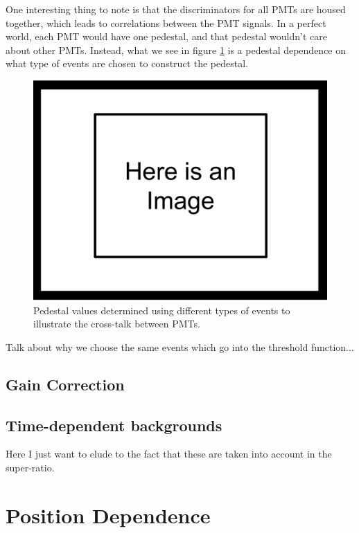 One interesting thing to note is that the discriminators for all PMTs are housed 
together, which leads to correlations between the PMT signals. In a perfect world, 
each PMT would have one pedestal, and that pedestal wouldn't care about other PMTs.
Instead, what we see in figure \ref{fig:peds_types} is a pedestal dependence on what 
type of events are chosen to construct the pedestal. 

\begin{figure}[h] \label{fig:peds_types}
\centering
\includegraphics[scale=.25]{3-UCNAAnalysis/ImageHolder.pdf}
\caption{Pedestal values determined using different types of events to illustrate
the cross-talk between PMTs.}
\end{figure}

Talk about why we choose the same events which go into the threshold function...


\subsection{Gain Correction}

\subsection{Time-dependent backgrounds}
Here I just want to elude to the fact that these are taken into account in
the super-ratio.


\section{Position Dependence}

